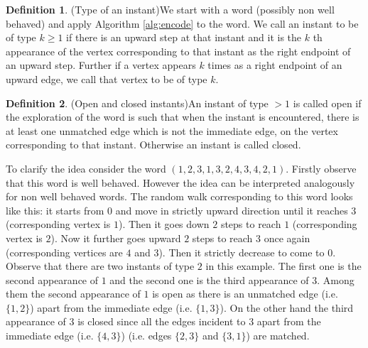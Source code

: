 \documentclass[12pt]{article}
\numberwithin{equation}{section}
\numberwithin{equation}{section}
\theoremstyle{definition}
\newtheorem{definition}{Definition}[section]
\renewcommand{\1}{\bf 1}
\begin{document}
 
\begin{definition}(Type of an instant)\label{def:type}
We start with a word (possibly non well behaved) and apply Algorithm \ref{alg:encode} to the word. We call an instant to be of type $k\ge 1$ if there is an upward step at that instant and it is the $k$ th appearance of the vertex corresponding to that instant as the right endpoint of an upward step. Further if a vertex appears $k$ times as a right endpoint of an upward edge, we call that vertex to be of type $k$.
\end{definition}  
\begin{definition}(Open and closed instants)\label{def:openclosed}
An instant of type $>1$ is called open if the exploration of the word is such that when the instant is encountered, there is at least one unmatched edge which is not the immediate edge, on the vertex corresponding to that instant. Otherwise an instant is called closed.
\end{definition}
To clarify the idea consider the word $(1,2,3,1,3,2,4,3,4,2,1)$. Firstly observe that this word is well behaved. However the idea can be interpreted analogously for non well behaved words. The random walk corresponding to this word looks like this: it starts from $0$ and move in strictly upward direction until it reaches $3$ (corresponding vertex is $1$). Then it goes down $2$ steps to reach $1$ (corresponding vertex is $2$). Now it further goes upward $2$ steps to reach $3$ once again (corresponding vertices are $4$ and $3$). Then it strictly decrease to come to $0$. Observe that there are two instants of type $2$ in this example. The first one is the second appearance of $1$ and the second one is the third appearance of $3$. Among them the second appearance of $1$ is open as there is an unmatched edge (i.e. $\{ 1,2\}$)  apart from the immediate edge (i.e. $\{1,3 \}$). On the other hand the third appearance of $3$ is closed since all the  edges incident to $3$ apart from the immediate edge (i.e. $\{ 4,3 \}$) (i.e. edges $\{ 2,3\}$ and $\{ 3,1 \}$) are matched.
\end{document}

